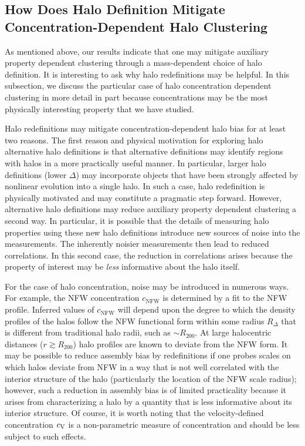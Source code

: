 \documentclass[usenatbib,fleqn]{mnras}
\begin{document}
\subsection{How Does Halo Definition Mitigate Concentration-Dependent Halo Clustering}

As mentioned above, our results indicate that one may mitigate auxiliary 
property dependent clustering through a mass-dependent choice of halo 
definition. It is interesting to ask why halo redefinitions may be 
helpful. In this subsection, we discuss the particular case of halo 
concentration dependent clustering in more detail in part because 
concentrations may be the most physically interesting property that 
we have studied.

Halo redefinitions may mitigate concentration-dependent halo bias for at least two reasons. The first reason and physical motivation for exploring halo alternative halo definitions is that alternative definitions may identify regions with halos in a more practically useful manner. In particular, larger halo definitions (lower $\Delta$) may incorporate objects that have been strongly affected by nonlinear evolution into a single halo. In such a case, halo redefinition is physically motivated and may constitute a pragmatic step forward. However, alternative halo definitions may reduce auxiliary property dependent clustering a second way. In particular, it is possible that the details of measuring halo properties using these new halo definitions introduce new sources of noise into the measurements. The inherently noisier measurements then lead to reduced correlations. In this second case, the reduction in correlations arises because the property of interest may be {\em less} informative about the halo itself.

For the case of halo concentration, noise may be introduced in numerous ways. For example, the NFW concentration $c_{\mathrm{NFW}}$ is determined by a fit to the 
NFW profile. Inferred values of $c_{\mathrm{NFW}}$ will depend upon 
the degree to which the density profiles of the halos follow the NFW 
functional form within some radius $R_{\Delta}$ that is different from 
traditional halo radii, such as $\sim R_{200}$. At large halocentric 
distances ($r \gtrsim R_{200}$) halo profiles are known to deviate 
from the NFW form. It may be possible to reduce assembly bias by redefinitions if one probes scales on which halos deviate from NFW in a way that is not well correlated with the interior structure of the halo (particularly the location of the NFW scale radius); however, such a reduction in assembly bias is of limited practicality because it arises from characterizing a halo by a quantity that is less informative about its interior structure. Of course, it is worth noting that the velocity-defined concentration $c_{\rm V}$ is a non-parametric measure of concentration and should be less subject to such effects. 
\end{document}
